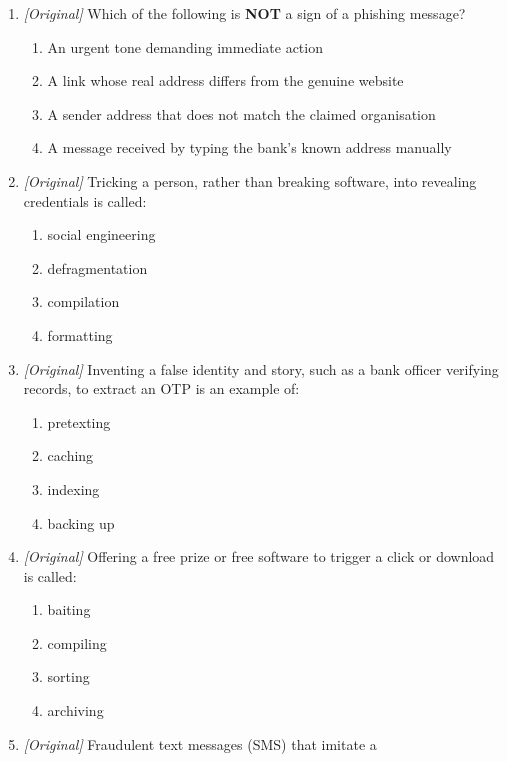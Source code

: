 \begin{enumerate}[label=\textbf{Q\arabic*.}, leftmargin=*]
\begin{enumerate}[label=\Alph*.]
    \item spoofing
    \item caching
  \end{enumerate}
\item \textit{[Original]} Which of the following is \textbf{NOT} a sign of
  a phishing message?
  \begin{enumerate}[label=\Alph*.]
    \item An urgent tone demanding immediate action
    \item A link whose real address differs from the genuine website
    \item A sender address that does not match the claimed organisation
    \item A message received by typing the bank's known address manually
  \end{enumerate}
\item \textit{[Original]} Tricking a person, rather than breaking software,
  into revealing credentials is called:
  \begin{enumerate}[label=\Alph*.]
    \item social engineering
    \item defragmentation
    \item compilation
    \item formatting
  \end{enumerate}
\item \textit{[Original]} Inventing a false identity and story, such as a
  bank officer verifying records, to extract an OTP is an example of:
  \begin{enumerate}[label=\Alph*.]
    \item pretexting
    \item caching
    \item indexing
    \item backing up
  \end{enumerate}
\item \textit{[Original]} Offering a free prize or free software to trigger
  a click or download is called:
  \begin{enumerate}[label=\Alph*.]
    \item baiting
    \item compiling
    \item sorting
    \item archiving
  \end{enumerate}
\item \textit{[Original]} Fraudulent text messages (SMS) that imitate a

\end{enumerate}
